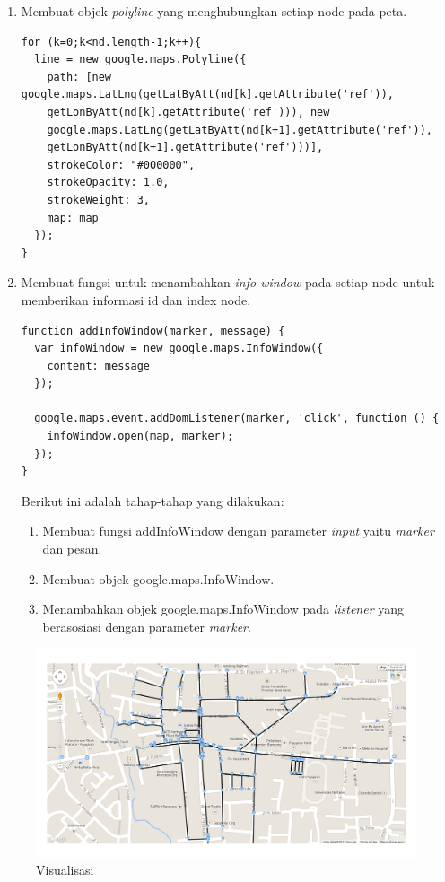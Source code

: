 \begin{enumerate}
  \item Membuat objek \textit{polyline} yang menghubungkan setiap node pada
  peta.
\begin{verbatim}
for (k=0;k<nd.length-1;k++){
  line = new google.maps.Polyline({
    path: [new google.maps.LatLng(getLatByAtt(nd[k].getAttribute('ref')),
    getLonByAtt(nd[k].getAttribute('ref'))), new
    google.maps.LatLng(getLatByAtt(nd[k+1].getAttribute('ref')),
    getLonByAtt(nd[k+1].getAttribute('ref')))], 
    strokeColor: "#000000",
    strokeOpacity: 1.0, 
    strokeWeight: 3,
    map: map
  });
}
\end{verbatim}
  
  \item Membuat fungsi untuk menambahkan \textit{info window} pada setiap node
  untuk memberikan informasi id dan index node.
\begin{verbatim}
function addInfoWindow(marker, message) {
  var infoWindow = new google.maps.InfoWindow({
    content: message
  });
  
  google.maps.event.addDomListener(marker, 'click', function () {
    infoWindow.open(map, marker);
  });
}
\end{verbatim}
  Berikut ini adalah tahap-tahap yang dilakukan:
  \begin{enumerate}
    \item Membuat fungsi addInfoWindow dengan parameter \textit{input} yaitu
    \textit{marker} dan pesan.
    
    \item Membuat objek google.maps.InfoWindow.
    
    \item Menambahkan objek google.maps.InfoWindow pada \textit{listener} yang
    berasosiasi dengan parameter \textit{marker}.
  \end{enumerate}
\end{enumerate}
\begin{figure}[h]
\centering
\includegraphics[scale=0.5]{Gambar/visualisasi_graf}
\caption[Visualisasi]{Visualisasi}
\label{fig:visualisasi}
\end{figure}
